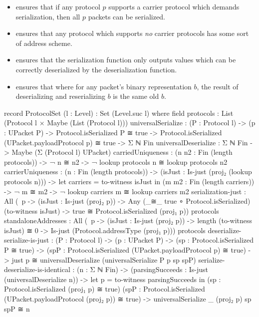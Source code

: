 \documentclass{report}
\begin{document}
\begin{itemize}
	\item {}  ensures that if any protocol \(p\) supports a carrier protocol which demands serialization, then all \(p\) packets can be serialized.
	\item {}  ensures that any protocol which supports \emph{no} carrier protocols has some sort of address scheme.
	\item {}  ensures that the serialization function only outputs values which can be correctly deserialized by the deserialization function.
	\item {}  ensures that where for any packet's binary representation \(b\), the result of deserializing and reserializing \(b\) is the same old \(b\).
\end{itemize}

\begin{code}
  record ProtocolSet (l : Level) : Set (Level.suc l) where
    field
      protocols : List (Protocol l × Maybe (List (Protocol l)))
      universalSerialize :
        (P : Protocol l) ->
        (p : UPacket P) ->
        Protocol.isSerialized P ≅ true ->
        Protocol.isSerialized (UPacket.payloadProtocol p) ≅ true ->
        Σ ℕ Fin
      universalDeserialize : Σ ℕ Fin -> Maybe (Σ (Protocol l) UPacket)
      carriedUniqueness :
        (n n2 : Fin (length protocols)) ->
        ¬ n ≅ n2 ->
        ¬ lookup protocols n ≅ lookup protocols n2
      carrierUniqueness :
        (n : Fin (length protocols)) ->
        (isJust : Is-just (proj₂ (lookup protocols n))) ->
        let carriers = to-witness isJust in
        (m m2 : Fin (length carriers)) ->
        ¬ m ≅ m2 ->
        ¬ lookup carriers m ≅ lookup carriers m2
      serialization-just :
        All (\ p -> (isJust : Is-just (proj₂ p))
                 -> Any (_≅_ true ∘ Protocol.isSerialized)
                        (to-witness isJust)
                 -> true ≅ Protocol.isSerialized (proj₁ p))
            protocols
      standaloneAddresses :
        All (\ p -> (isJust : Is-just (proj₂ p))
                 -> length (to-witness isJust) ≅ 0
                 -> Is-just (Protocol.addressType (proj₁ p)))
            protocols
      deserialize-serialize-is-just :
        (P : Protocol l) ->
        (p : UPacket P) ->
        (sp : Protocol.isSerialized P ≅ true) ->
        (spP : Protocol.isSerialized (UPacket.payloadProtocol p) ≅ true) ->
        just p ≅
        universalDeserialize (universalSerialize P p sp spP)
      serialize-deserialize-is-identical :
        (n : Σ ℕ Fin) ->
        (parsingSucceeds : Is-just (universalDeserialize n)) ->
        let p = to-witness parsingSucceeds in
        (sp : Protocol.isSerialized (proj₁ p) ≅ true)
        (spP : Protocol.isSerialized (UPacket.payloadProtocol (proj₂ p)) ≅ true) ->
        universalSerialize _ (proj₂ p) sp spP ≅ n
\end{code}
\end{document}
